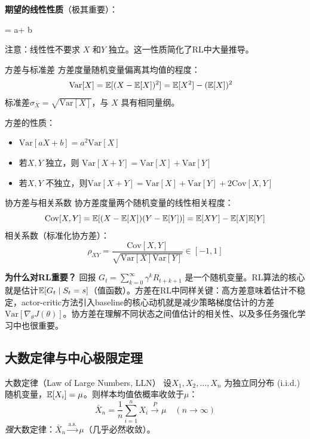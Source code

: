 \textbf{期望的线性性质}（极其重要）：
\begin{myformula}
\E[aX + bY] = a\E[X] + b\E[Y]
\end{myformula}
注意：线性性不要求 $X$ 和$Y$ 独立。这一性质简化了RL中大量推导。

\begin{mydefinition}{方差与标准差}
方差度量随机变量偏离其均值的程度：
\begin{align*}
\mathrm{Var}[X] &= \mathbb{E}[(X - \mathbb{E}[X])^2] = \mathbb{E}[X^2] - (\mathbb{E}[X])^2
\end{align*}
标准差$\sigma_X = \sqrt{\mathrm{Var}[X]}$，与 $X$ 具有相同量纲。
\end{mydefinition}

方差的性质：
\begin{itemize}
    \item $\mathrm{Var}[aX + b] = a^2 \mathrm{Var}[X]$
    \item 若$X, Y$ 独立，则 $\mathrm{Var}[X + Y] = \mathrm{Var}[X] + \mathrm{Var}[Y]$
    \item 若$X, Y$ 不独立，则$\mathrm{Var}[X + Y] = \mathrm{Var}[X] + \mathrm{Var}[Y] + 2\mathrm{Cov}[X, Y]$
\end{itemize}

\begin{mydefinition}{协方差与相关系数}
协方差度量两个随机变量的线性相关程度：
\[
\mathrm{Cov}[X, Y] = \mathbb{E}[(X - \mathbb{E}[X])(Y - \mathbb{E}[Y])] = \mathbb{E}[XY] - \mathbb{E}[X]\mathbb{E}[Y]
\]
相关系数（标准化协方差）：
\[
\rho_{XY} = \frac{\mathrm{Cov}[X, Y]}{\sqrt{\mathrm{Var}[X] \mathrm{Var}[Y]}} \in [-1, 1]
\]
\end{mydefinition}

\begin{remark} \textbf{为什么对RL重要？}
回报 $G_t = \sum_{k=0}^{\infty} \gamma^k R_{t+k+1}$ 是一个随机变量。RL算法的核心就是估计$\mathbb{E}[G_t \mid S_t = s]$（值函数）。方差在RL中同样关键：高方差意味着估计不稳定，actor-critic方法引入baseline的核心动机就是减少策略梯度估计的方差$\mathrm{Var}[\nabla_\theta J(\theta)]$。协方差在理解不同状态之间值估计的相关性、以及多任务强化学习中也很重要。
\end{remark}

\subsection{大数定律与中心极限定理}

\begin{myTheorem}{{大数定律（Law of Large Numbers, LLN）}}
设$X_1, X_2, \dots, X_n$ 为独立同分布 (i.i.d.) 随机变量，$\mathbb{E}[X_i] = \mu$。则样本均值依概率收敛于$\mu$：
\[
\bar{X}_n = \frac{1}{n} \sum_{i=1}^{n} X_i \xrightarrow{P} \mu \quad (n \to \infty)
\]
\emph{强}大数定律：$\bar{X}_n \xrightarrow{\text{a.s.}} \mu$（几乎必然收敛）。
\end{myTheorem}

